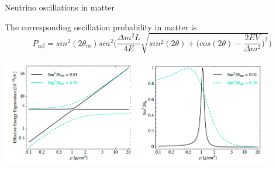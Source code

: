 \begin{frame}{Neutrino oscillations in matter}

The corresponding oscillation probability in matter is
  \begin{equation}
    \nonumber
    P_{\alpha \beta} = sin^2(2\theta_m) sin^2\Big(
       \frac{\Delta m^2 L}{4E}
       \sqrt{sin^2(2\theta) + \Big( cos(2\theta) - \frac{2EV}{\Delta m^2} \Big)^2}
    \Big)
  \end{equation}

  \begin{center}
    \includegraphics[width=0.88\textwidth]{./images/osc101/MSW1}\\
  \end{center}

\end{frame}

%
%
%

